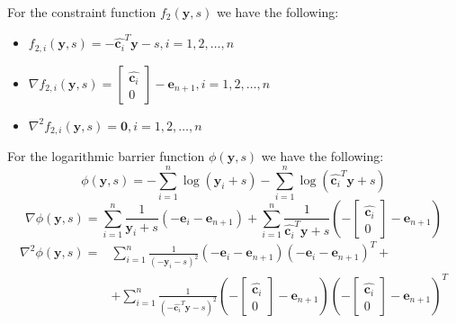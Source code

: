 \documentclass{beamer}
\begin{document}
\begin{frame}

\justifying
For the constraint function $f_{2}\left(\mathbf{y},s\right)$ we have the following:
\begin{itemize}
	\item $f_{2,i}\left(\mathbf{y},s\right) = -\hat{\mathbf{c}_{i}}^{T}\mathbf{y} - s, i=1,2,\dots,n$
	\item $\nabla f_{2,i}\left(\mathbf{y},s\right) = \begin{bmatrix}
										\hat{\mathbf{c}_{i}}\\
										0
									\end{bmatrix} - \mathbf{e}_{n+1}, i=1,2,\dots,n$
	\item $\nabla^{2}f_{2,i}\left(\mathbf{y},s\right) = \mathbf{0}, i=1,2,\dots,n$
\end{itemize}


\end{frame}



\begin{frame}

\justifying
For the logarithmic barrier function $\phi\left(\mathbf{y},s\right)$ we have the following:
$$
	\phi\left(\mathbf{y},s\right) = - \sum_{i=1}^{n} \log\left(\mathbf{y}_{i} + s\right) - \sum_{i=1}^{n} \log\left(\hat{\mathbf{c}_{i}}^{T}\mathbf{y} + s\right)
$$
$$
		\nabla \phi\left(\mathbf{y},s\right) = \sum_{i=1}^{n} \frac{1}{\mathbf{y}_{i} + s} \left(-\mathbf{e}_{i} - \mathbf{e}_{n+1}\right) + \sum_{i=1}^{n} \frac{1}{\hat{\mathbf{c}_{i}}^{T}\mathbf{y} + s} \left( - \begin{bmatrix}
										\hat{\mathbf{c}_{i}}\\
										0
									\end{bmatrix} - \mathbf{e}_{n+1} \right)
$$
\begin{align*}
		\nabla^{2}\phi\left(\mathbf{y},s\right) = & \sum_{i=1}^{n} \frac{1}{\left(- \mathbf{y}_{i} - s\right)^{2}}\left(-\mathbf{e}_{i}-\mathbf{e}_{n+1}\right) \left(-\mathbf{e}_{i}-\mathbf{e}_{n+1}\right)^{T} + \\ & + \sum_{i=1}^{n} \frac{1}{\left(-\hat{\mathbf{c}_{i}}^{T}\mathbf{y} - s \right)^{2}} \left( - \begin{bmatrix*}
										\hat{\mathbf{c}_{i}}\\
										0
									\end{bmatrix*} - \mathbf{e}_{n+1} \right)
									\left( - \begin{bmatrix*}
										\hat{\mathbf{c}_{i}}\\
										0
									\end{bmatrix*} - \mathbf{e}_{n+1} \right)^{T}
\end{align*}

\end{frame}
\end{document}
